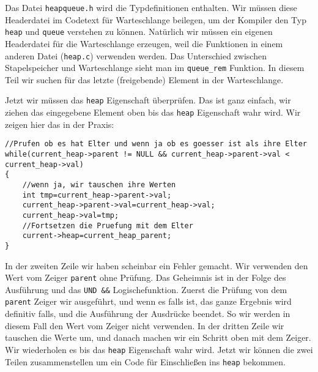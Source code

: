 Das Datei \texttt{heapqueue.h} wird die Typdefinitionen enthalten. Wir müssen
diese Headerdatei im Codetext für Warteschlange beilegen, um der Kompiler
den Typ \texttt{heap} und \texttt{queue} verstehen zu können. Natürlich wir müssen 
ein eigenen Headerdatei für die Warteschlange erzeugen, weil die Funktionen 
in einem anderen Datei (\texttt{heap.c}) verwenden werden. Das Unterschied
zwischen Stapelspeicher und Warteschlange sieht man im 
\texttt{queue\_rem} Funktion. In diesem Teil wir suchen für das letzte (freigebende) 
Element in der Warteschlange.

Jetzt wir müssen das \texttt{heap} Eigenschaft überprüfen. Das ist ganz einfach, 
wir ziehen das eingegebene Element oben bis das \texttt{heap} Eigenschaft wahr wird.
Wir zeigen hier das in der Praxis:
\begin{lstlisting}
//Prufen ob es hat Elter und wenn ja ob es goesser ist als ihre Elter
while(current_heap->parent != NULL && current_heap->parent->val < current_heap->val) 
{
    //wenn ja, wir tauschen ihre Werten
    int tmp=current_heap->parent->val;
    current_heap->parent->val=current_heap->val;
    current_heap->val=tmp;
    //Fortsetzen die Pruefung mit dem Elter
    current->heap=current_heap_parent;
}
\end{lstlisting}
In der zweiten Zeile wir haben scheinbar ein Fehler gemacht. Wir verwenden
den Wert vom Zeiger \texttt{parent} ohne Prüfung. 
Das Geheimnis ist in der
Folge des Ausführung und das \texttt{UND \&\&} Logischefunktion.
Zuerst die Prüfung von dem \texttt{parent} Zeiger wir ausgeführt, und wenn es falls ist, das
ganze Ergebnis wird definitiv falls, und die Ausführung der Ausdrücke beendet. 
So wir werden in diesem Fall den Wert vom Zeiger nicht verwenden.
In der dritten Zeile wir tauschen die Werte um, und danach machen
wir ein Schritt oben mit dem Zeiger. Wir wiederholen es bis
das \texttt{heap} Eigenschaft wahr wird. Jetzt wir können die zwei Teilen
zusammenstellen um ein Code für Einschließen ins \texttt{heap} bekommen.

